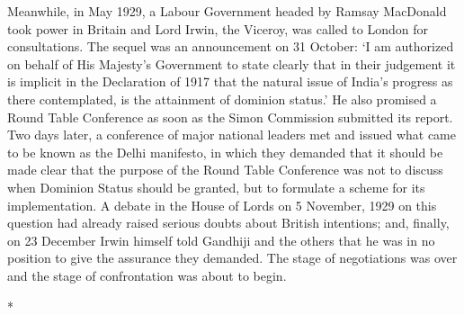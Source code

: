 Meanwhile, in May 1929, a Labour Government headed by Ramsay MacDonald took power in Britain and Lord Irwin, the Viceroy, was called to London for consultations. The sequel was an announcement on 31 October: `I am authorized on behalf of His Majesty's Government to state clearly that in their judgement it is implicit in the Declaration of 1917 that the natural issue of India's progress as there contemplated, is the attainment of dominion status.' He also promised a Round Table Conference as soon as the Simon Commission submitted its report. Two days later, a conference of major national leaders met and issued what came to be known as the Delhi manifesto, in which they demanded that it should be made clear that the purpose of the Round Table Conference was not to discuss when Dominion Status should be granted, but to formulate a scheme for its implementation. A debate in the House of Lords on 5 November, 1929 on this question had already raised serious doubts about British intentions; and, finally, on 23 December Irwin himself told Gandhiji and the others that he was in no position to give the assurance they demanded. The stage of negotiations was over and the stage of confrontation was about to begin.

\begin{center}*\end{center}

\paragraph*{}

